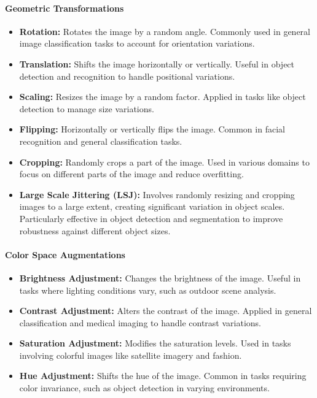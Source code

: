 \documentclass[12pt]{article}
\begin{document}
\paragraph{Geometric Transformations}
\begin{itemize}
    \item \textbf{Rotation:} Rotates the image by a random angle. Commonly used in general image classification tasks to account for orientation variations.
    \item \textbf{Translation:} Shifts the image horizontally or vertically. Useful in object detection and recognition to handle positional variations.
    \item \textbf{Scaling:} Resizes the image by a random factor. Applied in tasks like object detection to manage size variations.
    \item \textbf{Flipping:} Horizontally or vertically flips the image. Common in facial recognition and general classification tasks.
    \item \textbf{Cropping:} Randomly crops a part of the image. Used in various domains to focus on different parts of the image and reduce overfitting.
    \item \textbf{Large Scale Jittering (LSJ):} Involves randomly resizing and cropping images to a large extent, creating significant variation in object scales. Particularly effective in object detection and segmentation to improve robustness against different object sizes.
\end{itemize}

\paragraph{Color Space Augmentations}
\begin{itemize}
    \item \textbf{Brightness Adjustment:} Changes the brightness of the image. Useful in tasks where lighting conditions vary, such as outdoor scene analysis.
    \item \textbf{Contrast Adjustment:} Alters the contrast of the image. Applied in general classification and medical imaging to handle contrast variations.
    \item \textbf{Saturation Adjustment:} Modifies the saturation levels. Used in tasks involving colorful images like satellite imagery and fashion.
    \item \textbf{Hue Adjustment:} Shifts the hue of the image. Common in tasks requiring color invariance, such as object detection in varying environments.
\end{itemize}
\end{document}
